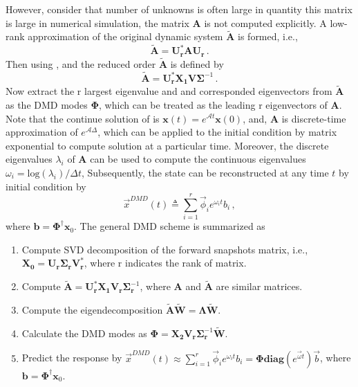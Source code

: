 However, consider that number of unknowns is often large in quantity this matrix is large in numerical simulation, the matrix $\mathbf{A}$ is not computed explicitly.
A low-rank approximation of the original dynamic system $\mathbf{\tilde{A}}$ is formed, i.e.,
\begin{equation}
\label{eq:reduced_dmd_1}
\mathbf{\tilde{A}} =  \mathbf{U_r^* A U_r} \, .
\end{equation}
Then using , and the reduced order $\mathbf{\tilde{A}}$ is defined by
\begin{equation}
\label{eq:reduced_dmd_2}
\mathbf{\tilde{A}} =  \mathbf{U_r^*} \mathbf{X_1} \mathbf{V} \bm{\Sigma}^{-1} \, .
\end{equation}
Now extract the r largest eigenvalue and and corresponded eigenvectors from $\mathbf{\tilde{A}}$ as the DMD modes $\boldsymbol{\Phi}$, which can be treated as the leading r eigenvectors of $\mathbf{A}$.
Note that the continue solution of  is $\mathbf{x}(t) = e^{\mathcal{A}t}\mathbf{x}(0)$, and, $\mathbf{A}$ is discrete-time approximation of $e^{\mathcal{A}\Delta}$, which can be applied to the initial condition by matrix exponential to compute solution at a particular time. 
Moreover, the discrete eigenvalues $\lambda_i$ of $\mathbf{A}$ can be used to compute the continuous eigenvalues $\omega_i= \text{log}(\lambda_i)/\Delta t$, Subsequently, the state can be reconstructed at any time $t$ by initial condition by  
\begin{equation}
\label{eq:dmd_predict}
\vec{x}^{DMD}(t) \triangleq \sum_{i=1}^{r} \vec{\phi}_i e^{\omega_it} b_i \, ,
\end{equation}
where $\mathbf{b}=\boldsymbol{\Phi}^{\dag} \mathbf{x}_{0}$. 
The general DMD scheme is summarized as

\begin{enumerate}
\item Compute SVD decomposition of the forward snapshots matrix, i.e., $ \mathbf{X_0} = \mathbf{U_r} \boldsymbol{\Sigma_r} \mathbf{V_r^{*}}$, where r indicates the rank of matrix.
\item Compute $\mathbf{\tilde{A}}=\mathbf{U_r^{*}X_1}\mathbf{V_r}\boldsymbol{\Sigma}_{\mathbf{r}}^{-1}$, where $\mathbf{A}$ and $\mathbf{\tilde{A}}$ are similar matrices.
\item Compute the eigendecomposition $\mathbf{\tilde{A} \tilde{W}}=\boldsymbol{\Lambda}\mathbf{\tilde{W}}$.
\item Calculate the DMD modes as ${\boldsymbol{\Phi}}={\mathbf{X_2V_r}}\boldsymbol{\Sigma}_\mathbf{r}^{-1}{\mathbf{\tilde{W}}}$.
\item Predict the response by $\vec{x}^{DMD}(t) \approx \sum_{i=1}^{r} \vec{\phi}_i e^{\omega_it} b_i = \boldsymbol{\Phi}{\mathbf{diag}}(e^{\vec{\omega}t})\vec{b}$, where $\mathbf{b}=\boldsymbol{\Phi}^{\dag} \mathbf{x}_{0}$.
\end{enumerate}


